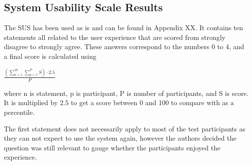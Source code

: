 \graphicspath{{fake_results/}}
\subsection{System Usability Scale Results}

The SUS has been used as is and can be found in Appendix XX. It contains ten statements all related to the user experience that are scored from strongly disagree to strongly agree. These answers correspond to the numbers 0 to 4, and a final score is calculated using 

$\frac{(\sum\limits_{n=1}^{10} \sum\limits_{p=1}^{P} S) \cdot 2.5 }{P}$ 

where n is statement, p is participant, P is number of participants, and S is score. It is multiplied by $2.5$ to get a score between 0 and 100 to compare with as a percentile. %

The first statement does not necessarily apply to most of the test participants as they can not expect to use the system again, however the authors decided the question was still relevant to gauge whether the participants enjoyed the experience. %

